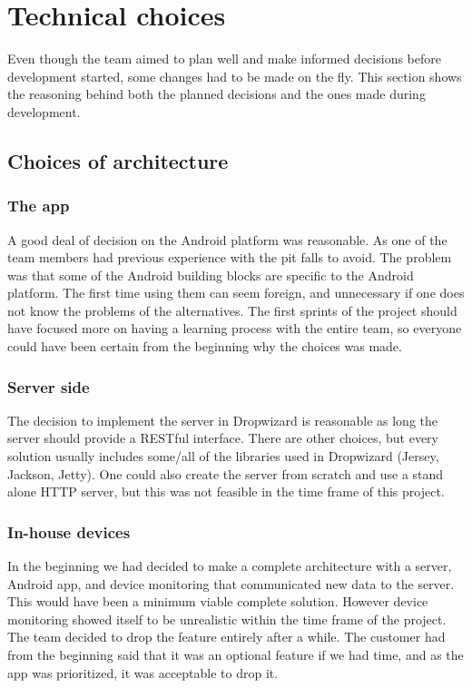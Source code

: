 \section{Technical choices}
Even though the team aimed to plan well and make informed decisions before development started, some changes had to be made on the fly. This section shows the reasoning behind both the planned decisions and the ones made during development.

\subsection{Choices of architecture}
\subsubsection{The app}
A good deal of decision on the Android platform was reasonable. As one of the team members had previous experience with the pit falls to avoid. The problem was that some of the Android building blocks are specific to the Android platform. The first time using them can seem foreign, and unnecessary if one does not know the problems of the alternatives. The first sprints of the project should have focused more on having a learning process with the entire team, so everyone could have been certain from the beginning why the choices was made.

\subsubsection{Server side}

The decision to implement the server in Dropwizard is reasonable as long the server should provide a RESTful interface. There are other choices, but every solution usually includes some/all of the libraries used in Dropwizard (Jersey, Jackson, Jetty). One could also create the server from scratch and use a stand alone HTTP server, but this was not feasible in the time frame of this project. 

\subsubsection{In-house devices}
In the beginning we had decided to make a complete architecture with a server, Android app, and device monitoring that communicated new data to the server. This would have been a minimum viable complete solution. However device monitoring showed itself to be unrealistic within the time frame of the project. The team decided to drop the feature entirely after a while. The customer had from the beginning said that it was an optional feature if we had time, and as the app was prioritized, it was acceptable to drop it.

